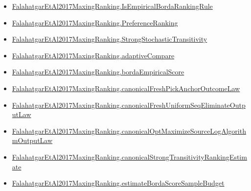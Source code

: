 \documentclass[10pt]{article}
\begin{document}
\begin{itemize}[leftmargin=1.2em]
\begin{itemize}[leftmargin=1.2em]
\item \hyperlink{paper-prerequisite-28cb5f649d63c5cb}{Falahatgar\allowbreak{}Et\allowbreak{}Al2017\allowbreak{}Maxing\allowbreak{}Ranking.\allowbreak{}Is\allowbreak{}Empirical\allowbreak{}Borda\allowbreak{}Ranking\allowbreak{}Rule}
\item \hyperlink{paper-prerequisite-b4c336afe891bbfe}{Falahatgar\allowbreak{}Et\allowbreak{}Al2017\allowbreak{}Maxing\allowbreak{}Ranking.\allowbreak{}Preference\allowbreak{}Ranking}
\item \hyperlink{paper-prerequisite-76807884cf8ad345}{Falahatgar\allowbreak{}Et\allowbreak{}Al2017\allowbreak{}Maxing\allowbreak{}Ranking.\allowbreak{}Strong\allowbreak{}Stochastic\allowbreak{}Transitivity}
\item \hyperlink{paper-prerequisite-8b894f32c9664991}{Falahatgar\allowbreak{}Et\allowbreak{}Al2017\allowbreak{}Maxing\allowbreak{}Ranking.\allowbreak{}adaptive\allowbreak{}Compare}
\item \hyperlink{paper-prerequisite-2a72291ebc16ccb3}{Falahatgar\allowbreak{}Et\allowbreak{}Al2017\allowbreak{}Maxing\allowbreak{}Ranking.\allowbreak{}borda\allowbreak{}Empirical\allowbreak{}Score}
\item \hyperlink{paper-prerequisite-10aa11ff14485756}{Falahatgar\allowbreak{}Et\allowbreak{}Al2017\allowbreak{}Maxing\allowbreak{}Ranking.\allowbreak{}canonical\allowbreak{}Fresh\allowbreak{}Pick\allowbreak{}Anchor\allowbreak{}Outcome\allowbreak{}Law}
\item \hyperlink{paper-prerequisite-9cfd680082bdff56}{Falahatgar\allowbreak{}Et\allowbreak{}Al2017\allowbreak{}Maxing\allowbreak{}Ranking.\allowbreak{}canonical\allowbreak{}Fresh\allowbreak{}Uniform\allowbreak{}Seq\allowbreak{}Eliminate\allowbreak{}Output\allowbreak{}Law}
\item \hyperlink{paper-prerequisite-eb9c8367737d1b01}{Falahatgar\allowbreak{}Et\allowbreak{}Al2017\allowbreak{}Maxing\allowbreak{}Ranking.\allowbreak{}canonical\allowbreak{}Opt\allowbreak{}Maximize\allowbreak{}Source\allowbreak{}Log\allowbreak{}Algorithm\allowbreak{}Output\allowbreak{}Law}
\item \hyperlink{paper-prerequisite-df9fc1df087145a6}{Falahatgar\allowbreak{}Et\allowbreak{}Al2017\allowbreak{}Maxing\allowbreak{}Ranking.\allowbreak{}canonical\allowbreak{}Strong\allowbreak{}Transitivity\allowbreak{}Ranking\allowbreak{}Estimate}
\item \hyperlink{paper-prerequisite-97e9bef8b2d861bf}{Falahatgar\allowbreak{}Et\allowbreak{}Al2017\allowbreak{}Maxing\allowbreak{}Ranking.\allowbreak{}estimate\allowbreak{}Borda\allowbreak{}Score\allowbreak{}Sample\allowbreak{}Budget}

\end{itemize}
\end{itemize}
\end{document}
